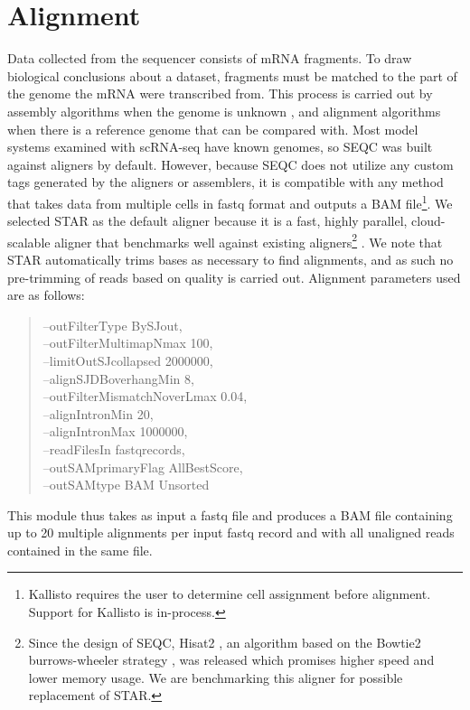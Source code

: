 \section{Alignment} %

Data collected from the sequencer consists of mRNA fragments.
To draw biological conclusions about a dataset, fragments must be matched to the part of the genome the mRNA were transcribed from. 
This process is carried out by assembly algorithms when the genome is unknown \citep{Haas2013}, and alignment algorithms when there is a reference genome that can be compared with.
Most model systems examined with scRNA-seq have known genomes, so SEQC was built against aligners by default.
However, because SEQC does not utilize any custom tags generated by the aligners or assemblers, it is compatible with any method that takes data from multiple cells in fastq format and outputs a BAM file\footnote{Kallisto requires the user to determine cell assignment before alignment. Support for Kallisto is in-process.}.
We selected STAR as the default aligner because it is a fast, highly parallel, cloud-scalable aligner that benchmarks well against existing aligners\footnote{Since the design of SEQC, Hisat2 \citep{Kim2015}, an algorithm based on the Bowtie2 burrows-wheeler strategy \citep{Langmead2012}, was released which promises higher speed and lower memory usage. We are benchmarking this aligner for possible replacement of STAR.} \citep{Ilicic2016}. 
We note that STAR automatically trims bases as necessary to find alignments, and as such no pre-trimming of reads based on quality is carried out. 
Alignment parameters used are as follows: 
\begin{quote}
\onehalfspacing
{\mono
--outFilterType BySJout,\\ 
--outFilterMultimapNmax 100,\\
--limitOutSJcollapsed 2000000,\\
--alignSJDBoverhangMin 8,\\
--outFilterMismatchNoverLmax 0.04,\\
--alignIntronMin 20,\\
--alignIntronMax 1000000,\\
--readFilesIn fastqrecords,\\
--outSAMprimaryFlag AllBestScore,\\
--outSAMtype BAM Unsorted
}
\end{quote}
This module thus takes as input a fastq file and produces a BAM file containing up to 20 multiple alignments per input fastq record and with all unaligned reads contained in the same file. 

